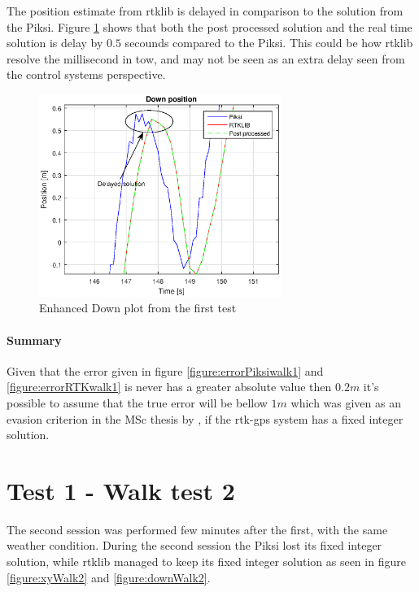 The position estimate from \gls{rtklib} is delayed in comparison to the solution from the Piksi. Figure \ref{figure:DownDelay} shows that both the post processed solution and the real time solution is delay by $0.5$ secounds compared to the Piksi. This could be how \gls{rtklib} resolve the millisecond in \acrfull{tow}, and may not be seen as an extra delay seen from the control systems perspective.
\begin{figure}[H]
	\centering
		\includegraphics[width=0.7\textwidth]{figs/plots/downDelay.eps}
		\caption{Enhanced Down plot from the first test}
		\label{figure:DownDelay}
\end{figure}
\paragraph{Summary}

Given that the error given in figure \ref{figure:errorPiksiwalk1} and \ref{figure:errorRTKwalk1} is never has a greater absolute value then $0.2m$ it's possible to assume that the true error will be bellow $1m$ which was given as an evasion criterion in the MSc thesis by \citep{Froelich}, if the \gls{rtk-gps} system has a fixed integer solution.

\section{Test 1 - Walk test 2}
The second session was performed few minutes after the first, with the same weather condition.
During the second session the Piksi lost its fixed integer solution, while \gls{rtklib} managed to keep its fixed integer solution as seen in figure \ref{figure:xyWalk2} and \ref{figure:downWalk2}.

